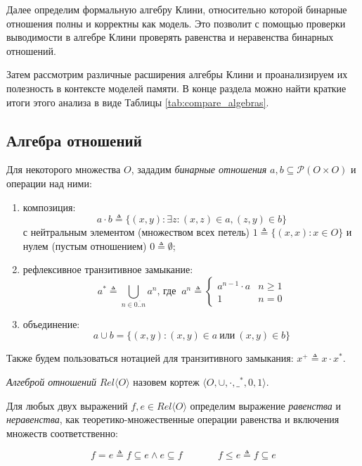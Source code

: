 \documentclass[times
              ,specification
              ,annotation
              ]{itmo-student-thesis}
\begin{document}
    Далее определим формальную алгебру Клини, относительно которой бинарные отношения полны и корректны как модель.
    Это позволит с помощью проверки выводимости в алгебре Клини проверять равенства и неравенства бинарных отношений.

    Затем рассмотрим различные расширения алгебры Клини и проанализируем их полезность в контексте
    моделей памяти.
    В конце раздела можно найти краткие итоги этого анализа в виде Таблицы \ref{tab:compare_algebras}.

    \subsection{Алгебра отношений}
      Для некоторого множества $ O $, зададим \textit{бинарные отношения}
      $ a, b \subseteq \mathcal{P}(O \times O) $
      и операции над ними:
      \begin{enumerate}
        \item композиция:
         $$a \cdot b \triangleq \{ (x, y) : \exists z : (x, z) \in a, (z, y) \in b \} $$
        с нейтральным элементом (множеством всех петель) $ 1 \triangleq \{(x, x) : x \in O\} $
        и нулем (пустым отношением) $ 0 \triangleq \emptyset $;
        \item рефлексивное транзитивное замыкание:
        $$ a^* \triangleq \bigcup\limits_{n \in \overline{0..n}} a^n
        \text{, где}\;\;
        a^n \triangleq \begin{cases}
          a^{n-1} \cdot a & n \ge 1\\
          1          & n = 0
        \end{cases}
        $$
       \item объединение:
       $$ a \cup b = \{(x, y) : (x, y) \in a ~\text{или}~ (x, y) \in b \} $$

      \end{enumerate}
      Также будем пользоваться нотацией для транзитивного замыкания: $ x^+ \triangleq x \cdot x^*$.

      \textit{Алгеброй отношений} $\mathit{Rel}\langle O \rangle$
      назовем кортеж  $\langle O, \cup, \cdot, \_^* , 0, 1\rangle $.

      Для любых двух выражений $ f, e \in \mathit{Rel}\langle O \rangle$ определим выражение \textit{равенства} и
      \textit{неравенства}, как теоретико-множественные операции равенства и включения множеств
      соответственно:

      $$ f = e \triangleq f \subseteq e \wedge e \subseteq f \;\;\;\;\;\;\;\;\;\;\;\;\; f \leq e \triangleq f \subseteq e $$
\end{document}
